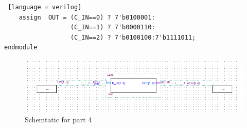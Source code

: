 \begin{itemize}
\begin{lstlisting} [language = verilog]
    assign 	OUT = (C_IN==0) ? 7'b0100001: 
                  (C_IN==1) ? 7'b0000110: 
                  (C_IN==2) ? 7'b0100100:7'b1111011;
endmodule
        \end{lstlisting}
        \begin{figure}[h]
            \centering
            \includegraphics[width=\textwidth]{source/picture/Lab1/Lab1_4.png}
            \caption{Schemtatic for part 4}
        \end{figure}
\end{itemize}

\clearpage
